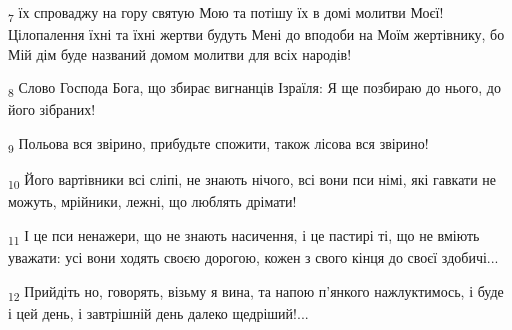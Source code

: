 \begin{tcolorbox}
\textsubscript{7} їх спроваджу на гору святую Мою та потішу їх в домі молитви Моєї! Цілопалення їхні та їхні жертви будуть Мені до вподоби на Моїм жертівнику, бо Мій дім буде названий домом молитви для всіх народів!
\end{tcolorbox}
\begin{tcolorbox}
\textsubscript{8} Слово Господа Бога, що збирає вигнанців Ізраїля: Я ще позбираю до нього, до його зібраних!
\end{tcolorbox}
\begin{tcolorbox}
\textsubscript{9} Польова вся звірино, прибудьте спожити, також лісова вся звірино!
\end{tcolorbox}
\begin{tcolorbox}
\textsubscript{10} Його вартівники всі сліпі, не знають нічого, всі вони пси німі, які гавкати не можуть, мрійники, лежні, що люблять дрімати!
\end{tcolorbox}
\begin{tcolorbox}
\textsubscript{11} І це пси ненажери, що не знають насичення, і це пастирі ті, що не вміють уважати: усі вони ходять своєю дорогою, кожен з свого кінця до своєї здобичі...
\end{tcolorbox}
\begin{tcolorbox}
\textsubscript{12} Прийдіть но, говорять, візьму я вина, та напою п'янкого нажлуктимось, і буде і цей день, і завтрішній день далеко щедріший!...
\end{tcolorbox}
